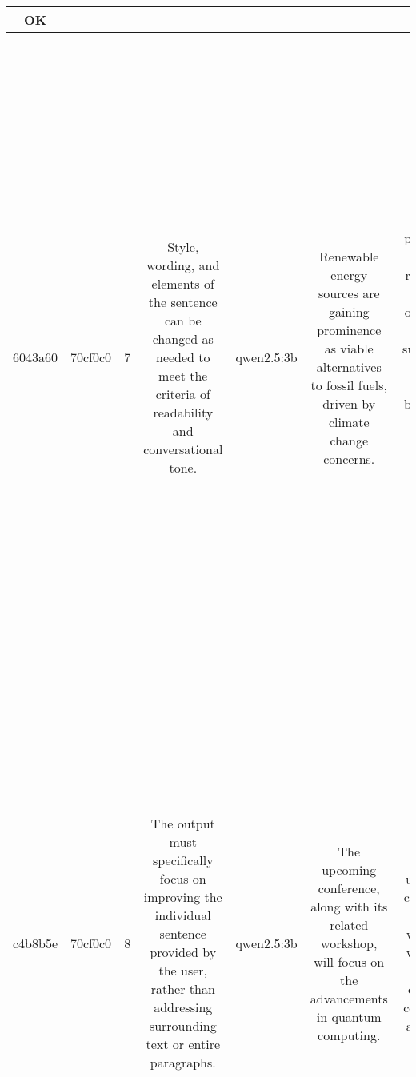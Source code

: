 \begin{table}[h!]
\begin{tabular}{|c|c|c|c|c|c|c|c|c|c|}
OK & \\
\hline
6043a60 & 70cf0c0 & 7 & Style, wording, and elements of the sentence can be changed as needed to meet the criteria of readability and conversational tone. & qwen2.5:3b & Renewable energy sources are gaining prominence as viable alternatives to fossil fuels, driven by climate change concerns. & More people are seeing renewable energy options as good substitutes for fossil fuels because of growing worries about climate change. & ok & The chatbot output is a well-structured sentence that enhances readability and sounds conversational. It simplifies complex phrases and uses accessible language, aligning with the description. The sentence maintains factual accuracy and preserves the original meaning, as expected. It creates a fluid and engaging structure, meeting the requirements stated in the description.

No violation.
OK & \\
\hline
c4b8b5e & 70cf0c0 & 8 & The output must specifically focus on improving the individual sentence provided by the user, rather than addressing surrounding text or entire paragraphs. & qwen2.5:3b & The upcoming conference, along with its related workshop, will focus on the advancements in quantum computing. & The upcoming conference and its workshop will focus on quantum computing advances. & err & The chatbot output presents a straightforward sentence about a conference and workshop centered on quantum computing advances. There is no indication of a conversational tone or simplified, relatable language. The sentence reads more like an informational statement rather than an engaging or fluid rewrite.

ERR & \\
\hline
ef472e0 & 70cf0c0 & 8 & The output must specifically focus on improving the individual sentence provided by the user, rather than addressing surrounding text or entire paragraphs. & qwen2.5:3b & Our conversation revealed the importance of transparency in corporate leadership. & We figured out how important it is for companies to be transparent with their leadership. & ok & The chatbot output, "We figured out how important it is for companies to be transparent with their leadership," seems to be a simple and conversational sentence. It appears to convey a clear idea about the importance of transparency in company leadership. The sentence uses straightforward language, avoids complex phrases, and has a fluid structure. Without the original input sentence, it's difficult to determine if the chatbot maintained the factual accuracy or preserved the original meaning. However, based on just the output, there are no apparent violations of the description provided, as it aligns with the goal of enhancing readability and using conversational language.


\end{tabular}
\end{table}

